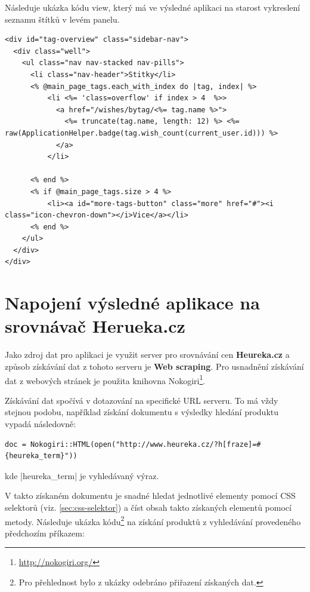 Následuje ukázka kódu view, který má ve výsledné aplikaci na starost vykreslení seznamu štítků v levém panelu.

\lstset{language = html, style=custom}
\begin{lstlisting}
<div id="tag-overview" class="sidebar-nav">
  <div class="well">
    <ul class="nav nav-stacked nav-pills">
      <li class="nav-header">Stitky</li>
      <% @main_page_tags.each_with_index do |tag, index| %>
          <li <%= 'class=overflow' if index > 4  %>>
            <a href="/wishes/bytag/<%= tag.name %>">
              <%= truncate(tag.name, length: 12) %> <%= raw(ApplicationHelper.badge(tag.wish_count(current_user.id))) %>
            </a>
          </li>

      <% end %>
      <% if @main_page_tags.size > 4 %>
          <li><a id="more-tags-button" class="more" href="#"><i class="icon-chevron-down"></i>Vice</a></li>
      <% end %>
    </ul>
  </div>
</div>
\end{lstlisting}

\section{Napojení výsledné aplikace na srovnávač Herueka.cz}
Jako zdroj dat pro aplikaci je využit server pro srovnávání cen \textbf{Heureka.cz} a způsob získávání dat z tohoto serveru je \textbf{Web scraping}. Pro usnadnění získávání dat z webových stránek je použita knihovna Nokogiri\footnote{\url{http://nokogiri.org/}}.

Získávání dat spočívá v dotazování na specifické URL serveru. To má vždy stejnou podobu, například získání dokumentu s výsledky hledání produktu vypadá následovně:

\lstset{language = ruby, style=custom}
\begin{lstlisting}
doc = Nokogiri::HTML(open("http://www.heureka.cz/?h[fraze]=#{heureka_term}"))
\end{lstlisting}

\noindent kde |heureka_term| je vyhledávaný výraz.

V takto získaném dokumentu je snadné hledat jednotlivé elementy pomocí CSS selektorů (viz. \ref{sec:css-selektor}) a číst obsah takto získaných elementů pomocí metody. Následuje ukázka kódu\footnote{Pro přehlednost bylo z ukázky odebráno přiřazení získaných dat.} na získání produktů z vyhledávání provedeného předchozím příkazem:

